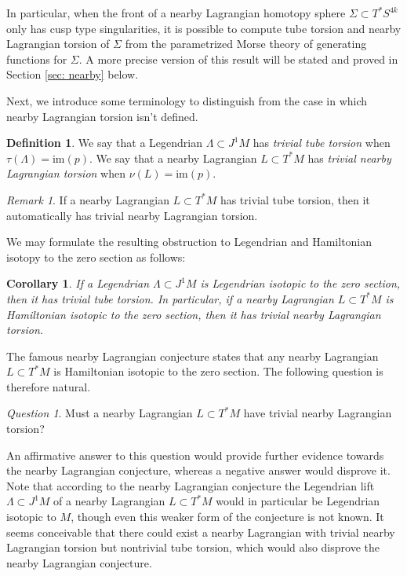 \documentclass{amsart}
\newtheorem{corollary}[theorem]{Corollary}
\theoremstyle{definition}
\newtheorem{definition}[theorem]{Definition}
\theoremstyle{remark}
\newtheorem{inductive lemma}[theorem]{Inductive Lemma}
\newtheorem{remark}[theorem]{Remark}
\newtheorem{question}[theorem]{Question}
\begin{document}
  In particular, when the front of a nearby Lagrangian homotopy sphere $\Sigma \subset T^*S^{4k}$ only has cusp type singularities, it is possible to compute tube torsion and nearby Lagrangian torsion of $\Sigma$ from the parametrized Morse theory of generating functions for $\Sigma$. A more precise version of this result will be stated and proved in Section \ref{sec: nearby} below.

  
  Next, we introduce some terminology to distinguish from the case in which nearby Lagrangian torsion isn't defined.


\begin{definition} We say that a Legendrian $\Lambda \subset J^1 M$ has {\em trivial tube torsion} when $\tau(\Lambda) =\text{im}(p)$. We say that a nearby Lagrangian $L \subset T^*M$ has {\em trivial nearby Lagrangian torsion} when $\nu(L)=\text{im}(p)$. \end{definition}


\begin{remark} If a nearby Lagrangian $L \subset T^*M$ has trivial tube torsion, then it automatically has trivial nearby Lagrangian torsion. \end{remark}

We may formulate the resulting obstruction to Legendrian and Hamiltonian isotopy to the zero section as follows:
 
 \begin{corollary} If a Legendrian $\Lambda \subset J^1M$ is Legendrian isotopic to the zero section, then it has trivial tube torsion. In particular, if a nearby Lagrangian $L \subset T^*M$ is Hamiltonian isotopic to the zero section, then it has trivial nearby Lagrangian torsion. \end{corollary}
 
 The famous nearby Lagrangian conjecture states that any nearby Lagrangian $L \subset T^*M$ is Hamiltonian isotopic to the zero section. The following question is therefore natural.
  
 \begin{question}\label{ques: nearby Lag}
Must a nearby Lagrangian $L \subset T^*M$ have trivial nearby Lagrangian torsion? 
\end{question}

An affirmative answer to this question would provide further evidence towards the nearby Lagrangian conjecture, whereas a negative answer would disprove it. Note that according to the nearby Lagrangian conjecture the Legendrian lift $\Lambda \subset J^1M$ of a nearby Lagrangian $L \subset T^*M$ would in particular  be Legendrian isotopic to $M$, though even this weaker form of the conjecture is not known. It seems conceivable that there could exist a nearby Lagrangian with trivial nearby Lagrangian torsion but nontrivial tube torsion, which would also disprove the nearby Lagrangian conjecture. 
\end{document}
